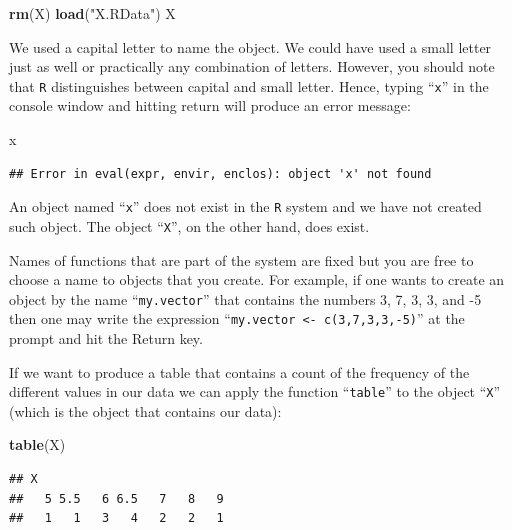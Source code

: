 \documentclass[
]{krantz}
\makeatletter
\newenvironment{Shaded}{\begin{snugshade}}{\end{snugshade}}
\newcommand{\KeywordTok}[1]{\textcolor[rgb]{0.13,0.29,0.53}{\textbf{#1}}}
\newcommand{\NormalTok}[1]{#1}
\newcommand{\StringTok}[1]{\textcolor[rgb]{0.31,0.60,0.02}{#1}}
\newenvironment{kframe}{%
\medskip{}
\setlength{\fboxsep}{.8em}
 \def\at@end@of@kframe{}%
 \ifinner\ifhmode%
  \def\at@end@of@kframe{\end{minipage}}%
  \begin{minipage}{\columnwidth}%
 \fi\fi%
 \def\FrameCommand##1{\hskip\@totalleftmargin \hskip-\fboxsep
 \colorbox{shadecolor}{##1}\hskip-\fboxsep
     \hskip-\linewidth \hskip-\@totalleftmargin \hskip\columnwidth}%
 \MakeFramed {\advance\hsize-\width
   \@totalleftmargin\z@ \linewidth\hsize
   \@setminipage}}%
 {\par\unskip\endMakeFramed%
 \at@end@of@kframe}
\renewenvironment{Shaded}{\begin{kframe}}{\end{kframe}}
\theoremstyle{definition}
\theoremstyle{definition}
\theoremstyle{definition}
\theoremstyle{remark}
\makeatother
\begin{document}
\begin{Shaded}
\begin{Highlighting}[]
\KeywordTok{rm}\NormalTok{(X)}
\KeywordTok{load}\NormalTok{(}\StringTok{"X.RData"}\NormalTok{)}
\NormalTok{X}
\end{Highlighting}
\end{Shaded}

We used a capital letter to name the object. We could have used a small letter just as well or practically any combination of letters. However, you should note that \texttt{R} distinguishes between capital and small letter. Hence, typing ``\texttt{x}'' in the console window and hitting return will produce an error message:

\begin{Shaded}
\begin{Highlighting}[]
\NormalTok{x}
\end{Highlighting}
\end{Shaded}

\begin{verbatim}
## Error in eval(expr, envir, enclos): object 'x' not found
\end{verbatim}

An object named ``\texttt{x}'' does not exist in the \texttt{R} system and we have not created such object. The object ``\texttt{X}'', on the other hand, does exist.

Names of functions that are part of the system are fixed but you are free to choose a name to objects that you create. For example, if one wants to create an object by the name ``\texttt{my.vector}'' that contains the numbers 3, 7, 3, 3, and -5 then one may write the expression ``\texttt{my.vector\ \textless{}-\ c(3,7,3,3,-5)}'' at the prompt and hit the Return key.

If we want to produce a table that contains a count of the frequency of the different values in our data we can apply the function ``\texttt{table}'' to the object ``\texttt{X}'' (which is the object that contains our data):

\begin{Shaded}
\begin{Highlighting}[]
\KeywordTok{table}\NormalTok{(X)}
\end{Highlighting}
\end{Shaded}

\begin{verbatim}
## X
##   5 5.5   6 6.5   7   8   9 
##   1   1   3   4   2   2   1
\end{verbatim}
\end{document}
